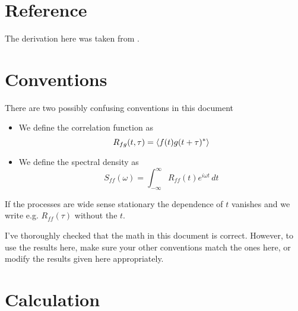 \section{Reference}

The derivation here was taken from \cite{MattL:modulated_noise:2015}.

\section{Conventions}

There are two possibly confusing conventions in this document
\begin{itemize}
\item We define the correlation function as
\begin{equation}
R_{fg}(t, \tau) = \left \langle f(t) g(t+\tau)^* \right \rangle
\end{equation}
\item We define the spectral density as
\begin{equation}
S_{ff}(\omega) = \int_{-\infty}^\infty R_{ff}(t) e^{i \omega t}\,dt
\end{equation}
\end{itemize}

If the processes are wide sense stationary the dependence of $t$ vanishes and we write e.g. $R_{ff}(\tau)$ without the $t$.

I've thoroughly checked that the math in this document is correct.
However, to use the results here, make sure your other conventions match the ones here, or modify the results given here appropriately.

\section{Calculation}

